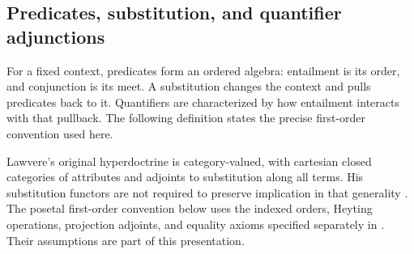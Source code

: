 
\subsection{Predicates, substitution, and quantifier adjunctions}
\label{sec:p10-doctrine-quantifiers}

For a fixed context, predicates form an ordered algebra: entailment
is its order, and conjunction is its meet.  A substitution changes
the context and pulls predicates back to it.  Quantifiers are
characterized by how entailment interacts with that pullback.
The following definition states the precise first-order convention
used here.

Lawvere's original hyperdoctrine is category-valued, with cartesian
closed categories of attributes and adjoints to substitution along
all terms.  His substitution functors are not required to preserve
implication in that generality
\cite[pp.~11--13]{Lawvere2006AdjointnessReprint}.
The posetal first-order convention below uses the indexed orders,
Heyting operations, projection adjoints, and equality axioms
specified separately in
\cite[Definitions~5.2.1, 5.4.1, 5.5.1, and 5.6.1,
pp.~41--56]{Pitts1995Draft}.
Their assumptions are part of this presentation.

